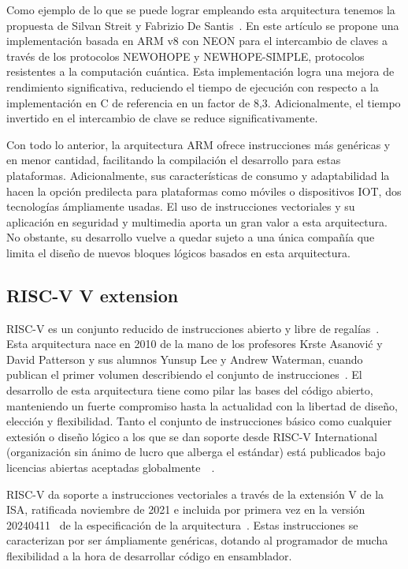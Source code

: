 Como ejemplo de lo que se puede lograr empleando esta arquitectura tenemos la
propuesta de Silvan Streit y Fabrizio De Santis~\cite{armv8-keyExchange}. En
este artículo se propone una implementación basada en ARM v8 con NEON para el
intercambio de claves a través de los protocolos NEWOHOPE y NEWHOPE-SIMPLE,
protocolos resistentes a la computación cuántica. Esta implementación logra una
mejora de rendimiento significativa, reduciendo el tiempo de ejecución con
respecto a la implementación en C de referencia en un factor de 8,3.
Adicionalmente, el tiempo invertido en el intercambio de clave se reduce
significativamente.

Con todo lo anterior, la arquitectura ARM ofrece instrucciones más genéricas y
en menor cantidad, facilitando la compilación el desarrollo para estas
plataformas. Adicionalmente, sus características de consumo y adaptabilidad la
hacen la opción predilecta para plataformas como móviles o dispositivos IOT,
dos tecnologías ámpliamente usadas. El uso de instrucciones vectoriales y su
aplicación en seguridad y multimedia aporta un gran valor a esta arquitectura.
No obstante, su desarrollo vuelve a quedar sujeto a una única compañía que
limita el diseño de nuevos bloques lógicos basados en esta arquitectura.

\subsection{RISC-V V extension}

RISC-V es un conjunto reducido de instrucciones abierto y libre de
regalías~\cite{riscV-org}. Esta arquitectura nace en 2010 de la mano de los
profesores Krste Asanović y David Patterson y sus alumnos Yunsup Lee y Andrew
Waterman, cuando publican el primer volumen describiendo el conjunto de
instrucciones~\cite{riscv-2011}. El desarrollo de esta arquitectura tiene como
pilar las bases del código abierto, manteniendo un fuerte compromiso hasta la
actualidad con la libertad de diseño, elección y flexibilidad. Tanto el
conjunto de instrucciones básico como cualquier extesión o diseño lógico  a los
que se dan soporte desde RISC-V International (organización sin ánimo de lucro
que alberga el estándar) está publicados bajo licencias abiertas aceptadas
globalmente~\cite{riscV-org}~\cite{asanovic2014instruction}.

RISC-V da soporte a instrucciones vectoriales a través de la extensión V de la
ISA, ratificada noviembre de 2021 e incluida por primera vez en la versión
20240411~\cite{riscv-isa2024} de la especificación de la
arquitectura~\cite{riscv-ratificationEspects}. Estas
instrucciones se caracterizan por ser ámpliamente genéricas, dotando al
programador de mucha flexibilidad a la hora de desarrollar código en ensamblador.


